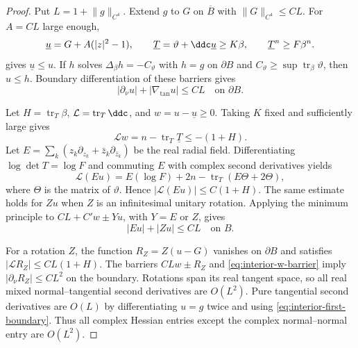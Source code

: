 \begin{proof}
Put $L=1+\lVert g\rVert_{C^4}$. Extend $g$ to $G$ on $\overline B$ with $\lVert G\rVert_{C^4}\leq CL$. For $A=CL$ large enough,
\[
  \underline u=G+A(|z|^2-1),
  \qquad
  \underline T=\vartheta+\ddc\underline u\geq K\beta,
  \qquad
  \underline T^n\geq F\beta^n.
\]
 gives $\underline u\leq u$. If $h$ solves $\Delta_\beta h=-C_\vartheta$ with $h=g$ on $\partial B$ and $C_\vartheta\geq\sup\operatorname{tr}_\beta\vartheta$, then $u\leq h$. Boundary differentiation of these barriers gives
\begin{equation}\label{eq:interior-first-boundary}
  |\partial_\nu u|+|\nabla_{\tan}u|\leq CL
  \quad\text{on }\partial B.
\end{equation}

Let $H=\operatorname{tr}_T\beta$, $\mathcal L=\operatorname{tr}_T\ddc$, and $w=u-\underline u\geq0$. Taking $K$ fixed and sufficiently large gives
\begin{equation}\label{eq:interior-w-barrier}
  \mathcal Lw=n-\operatorname{tr}_T\underline T\leq-(1+H).
\end{equation}
Let $E=\sum_k(z_k\partial_{z_k}+\bar z_k\partial_{\bar z_k})$ be the real radial field. Differentiating $\log\det T=\log F$ and commuting $E$ with complex second derivatives yields
\[
  \mathcal L(Eu)=E(\log F)+2n-\operatorname{tr}_T(E\Theta+2\Theta),
\]
where $\Theta$ is the matrix of $\vartheta$. Hence $|\mathcal L(Eu)|\leq C(1+H)$. The same estimate holds for $Zu$ when $Z$ is an infinitesimal unitary rotation. Applying the minimum principle to $CL+C'w\pm Yu$, with $Y=E$ or $Z$, gives
\begin{equation}\label{eq:interior-first-fields}
  |Eu|+|Zu|\leq CL\quad\text{on }B.
\end{equation}

For a rotation $Z$, the function $R_Z=Z(u-G)$ vanishes on $\partial B$ and satisfies $|\mathcal LR_Z|\leq CL(1+H)$. The barriers $CLw\pm R_Z$ and \eqref{eq:interior-w-barrier} imply $|\partial_\nu R_Z|\leq CL^2$ on the boundary. Rotations span its real tangent space, so all real mixed normal--tangential second derivatives are $O(L^2)$. Pure tangential second derivatives are $O(L)$ by differentiating $u=g$ twice and using \eqref{eq:interior-first-boundary}. Thus all complex Hessian entries except the complex normal--normal entry are $O(L^2)$.


\end{proof}
